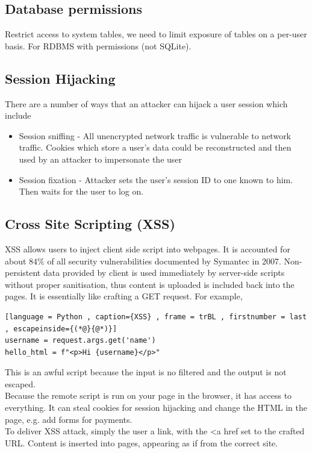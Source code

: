 \documentclass[a4paper]{article}
\theoremstyle{plain}
\theoremstyle{definition}
\theoremstyle{remark}
\begin{document}
\begin{flushleft}
\subsection{Database permissions}
Restrict access to system tables, we need to limit exposure of tables on a per-user basis. For RDBMS with permissions (not SQLite). 
\subsection{Session Hijacking}
There are a number of ways that an attacker can hijack a user session which include
\begin{itemize}
	\item Session sniffing - All unencrypted network traffic is vulnerable to network traffic. Cookies which store a user's data could be reconstructed and then used by an attacker to impersonate the user
	\item Session fixation - Attacker sets the user's session ID to one known to him. Then waits for the user to log on.
\end{itemize}
\subsection{Cross Site Scripting (XSS)}
XSS allows users to inject client side script into webpages. It is accounted for about $84\%$ of all security vulnerabilities documented by Symantec in 2007. Non-persistent data provided by client is used immediately by server-side scripts without proper sanitisation, thus content is uploaded is included back into the pages. It is essentially like crafting a GET request. For example,
\begin{lstlisting}[language = Python , caption={XSS} , frame = trBL , firstnumber = last , escapeinside={(*@}{@*)}]
username = request.args.get('name')
hello_html = f"<p>Hi {username}</p>" 
\end{lstlisting}
This is an awful script because the input is no filtered and the output is not escaped. \\
Because the remote script is run on your page in the browser, it has access to everything. It can steal cookies for session hijacking and change the HTML in the page, e.g. add forms for payments. \\
To deliver XSS attack, simply the user a link, with the <a href set to the crafted URL. Content is inserted into pages, appearing as if from the correct site.

\end{flushleft}
\end{document}
